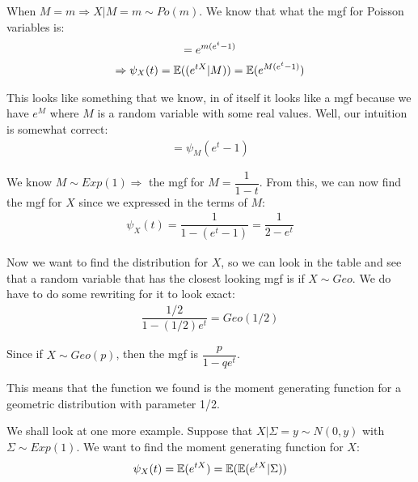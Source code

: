 \noindent When $M = m\Rightarrow X|M = m\sim Po(m)$. We know that what the mgf for Poisson variables is:
\begin{equation*}
  \begin{gathered}
     = e^{m(e^t-1)}\\
     \Rightarrow \psi_X(t) = \mathbb{E}((e^{tX}|M)) = \mathbb{E}(e^{M(e^t-1)})
  \end{gathered}
\end{equation*}\par
\noindent This looks like something that we know, in of itself it looks like a mgf because we have $e^M$ where $M$ is a random variable with some real values. Well, our intuition is somewhat correct:
\begin{equation*}
  \begin{gathered}
    =\psi_M(e^t-1)
  \end{gathered}
\end{equation*}
\par\bigskip
\noindent We know $M\sim Exp(1)\Rightarrow$ the mgf for $M = \dfrac{1}{1-t}$. From this, we can now find the mgf for $X$ since we expressed in the terms of $M$:
\begin{equation*}
  \begin{gathered}
    \psi_X(t) = \dfrac{1}{1-(e^t-1)} = \dfrac{1}{2-e^t}
  \end{gathered}
\end{equation*}
\par\bigskip
\noindent Now we want to find the distribution for $X$, so we can look in the table and see that a random variable that has the closest looking mgf is if $X\sim Geo$. We do have to do some rewriting for it to look exact:
\begin{equation*}
  \begin{gathered}
    \dfrac{1/2}{1-(1/2)e^t} = Geo(1/2)
  \end{gathered}
\end{equation*}\par
\noindent Since if $X\sim Geo(p)$, then the mgf is $\dfrac{p}{1-qe^t}$.\par
\noindent This means that the function we found is the moment generating function for a geometric distribution with parameter 1/2. 
\par\bigskip
\noindent We shall look at one more example. Suppose that $X|\Sigma = y\sim N(0,y)$ with $\Sigma\sim Exp(1)$. We want to find the moment generating function for $X$:
\begin{equation*}
  \begin{gathered}
    \psi_X(t) = \mathbb{E}(e^{tX}) = \mathbb{E}(\mathbb{E}(e^{tX}|\Sigma))
  \end{gathered}
\end{equation*}\par

